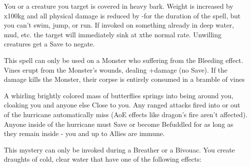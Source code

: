 {\newpage

\MYSTERY [
  Name = Barkskin,
  Link = arcana-mystery-barkskin,
  Paradigm = Biomancy,
  Save = Y (neg.),
  Duration = Combat or \SUM Minutes,
  Target = Self or Close Target(s)
]

You or a creature you target is covered in heavy bark.  Weight is increased by \DICE x100kg and all physical damage is reduced by -\DICE for the duration of the spell, but you can't swim, jump, or run. If invoked on something already in deep water, mud, etc. the target will immediately sink at x\DICE the normal rate. Unwilling creatures get a Save to negate. 

\MYSTERY [
  Name = Bloodvine,
  Link = arcana-mystery-bloodvine,
  Paradigm = Biomancy,
  Save = N,
  Duration = Instant,
  Target = Close or Nearby Target(s)
]

This spell can only be used on a Monster who suffering from the Bleeding effect.  Vines erupt from the Monster's wounds, dealing \SUMDICE+\DICE damage (no Save).  If the damage kills the Monster, their corpse is entirely consumed in a bramble of vines

\MYSTERY [
  Name = Butterfly Hurricane,
  Link = arcana-mystery-butterfly-hurricane,
  Paradigm = Biomancy,
  Save = Y (neg.),
  Duration = Combat or \SUM Minutes,
  Target = Self
]

A whirling brightly colored mass of butterflies springs into being around you, cloaking you and anyone else Close to you.  Any ranged attacks fired into or out of the hurricane automatically miss (AoE effects like dragon's fire aren't affected).  Anyone inside of the hurricane must Save or become Befuddled for as long as they remain inside - you and up to \DICE Allies are immune.

\MYSTERY [
  Name = Clearwater,
  Link = arcana-mystery-clearwater,
  Paradigm = Elements,
  Save = n/a,
  Duration = Instant,
  Target = Self or Close Target(s)
]

This mystery can only be invoked during a Breather or a Bivouac.  You create \DICE draughts of cold, clear water that have one of the following effects:


}
